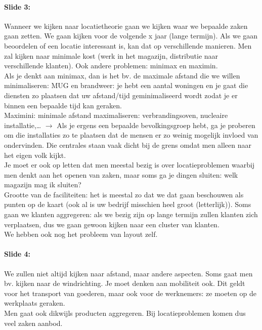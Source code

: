 \documentclass[10pt,a4paper]{report}
\begin{document}
\paragraph{Slide 3:} Wanneer we kijken naar locatietheorie gaan we kijken waar we bepaalde zaken gaan zetten. We gaan kijken voor de volgende x jaar (lange termijn). Als we gaan beoordelen of een locatie interessant is, kan dat op verschillende manieren. Men zal kijken naar minimale kost (werk in het magazijn, distributie naar verschillende klanten). Ook andere problemen: minimax en maximin.\\
Als je denkt aan minimax, dan is het bv. de maximale afstand die we willen minimaliseren: MUG en brandweer: je hebt een aantal woningen en je gaat die diensten zo plaatsen dat uw afstand/tijd geminimaliseerd wordt zodat je er binnen een bepaalde tijd kan geraken.\\
Maximini: minimale afstand maximaliseren: verbrandingsoven, nucleaire installatie,… $\rightarrow$ Als je ergens een bepaalde bevolkingsgroep hebt, ga je proberen om die installaties zo te plaatsen dat de mensen er zo weinig mogelijk invloed van ondervinden. Die centrales staan vaak dicht bij de grens omdat men alleen naar het eigen volk kijkt. \\
Je moet er ook op letten dat men meestal bezig is over locatieproblemen waarbij men denkt aan het openen van zaken, maar soms ga je dingen sluiten: welk magazijn mag ik sluiten?\\
Grootte van de faciliteiten: het is meestal zo dat we dat gaan beschouwen als punten op de kaart (ook al is uw bedrijf misschien heel groot (letterlijk)). Soms gaan we klanten aggregeren: als we bezig zijn op lange termijn zullen klanten zich verplaatsen, dus we gaan gewoon kijken naar een cluster van klanten.\\
We hebben ook nog het probleem van layout zelf.

\paragraph{Slide 4:} We zullen niet altijd kijken naar afstand, maar andere aspecten. Soms gaat men bv. kijken naar de windrichting. Je moet denken aan mobiliteit ook. Dit geldt voor het transport van goederen, maar ook voor de werknemers: ze moeten op de werkplaats geraken.\\ Men gaat ook dikwijls producten aggregeren.
Bij locatieproblemen komen dus veel zaken aanbod.
\end{document}
